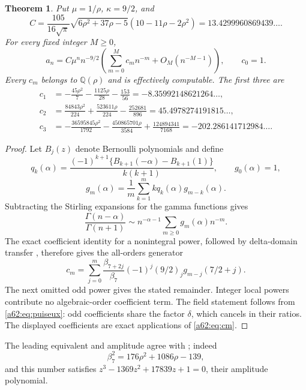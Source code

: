 \documentclass[11pt,letterpaper]{article}
\newtheorem{theorem}{Theorem}[section]
\theoremstyle{remark}\newtheorem{remark}[theorem]{Remark}
\newcommand{\Q}{\mathbb Q}
\begin{document}
\begin{theorem}\label{a62:thm:asymptotic}
Put $\mu=1/\rho$, $\kappa=9/2$, and
\[
 C=\frac{105}{16\sqrt\pi}\sqrt{6\rho^2+37\rho-5}(10-11\rho-2\rho^2)
 =13.4299960869439\ldots.
\]
For every fixed integer $M\ge0$,
\[
 a_n=C\mu^n n^{-9/2}\left(\sum_{m=0}^M c_mn^{-m}+O_M(n^{-M-1})\right),\qquad c_0=1.
\]
Every $c_m$ belongs to $\Q(\rho)$ and is effectively computable. The first three are
\begin{align*}
 c_1&=-\frac{45\rho^2}{7}-\frac{1125\rho}{28}-\frac{153}{56}
 =-8.35992148621264\ldots,\\
 c_2&=\frac{84843\rho^2}{224}+\frac{523611\rho}{224}-\frac{252681}{896}
 =45.4978274191815\ldots,\\
 c_3&=-\frac{36595845\rho^2}{1792}-\frac{450865701\rho}{3584}
       +\frac{124894341}{7168}
 =-202.286141712984\ldots.
\end{align*}
\end{theorem}
\begin{proof}
Let $B_j(z)$ denote Bernoulli polynomials and define
\[
 q_k(\alpha)=\frac{(-1)^{k+1}\{B_{k+1}(-\alpha)-B_{k+1}(1)\}}{k(k+1)},\qquad
 g_0(\alpha)=1,
\]
\[
 g_m(\alpha)=\frac1m\sum_{k=1}^m kq_k(\alpha)g_{m-k}(\alpha).
\]
Subtracting the Stirling expansions for the gamma functions gives
\[
 \frac{\Gamma(n-\alpha)}{\Gamma(n+1)}
 \sim n^{-\alpha-1}\sum_{m\ge0}g_m(\alpha)n^{-m}.
\]
The exact coefficient identity for a nonintegral power, followed by delta-domain transfer \cite{FS}, therefore gives the all-orders generator
\begin{equation}\label{a62:eq:cm}
 c_m=\sum_{j=0}^m\frac{\beta_{7+2j}}{\beta_7}(-1)^j(9/2)_j
                g_{m-j}(7/2+j).
\end{equation}
The next omitted odd power gives the stated remainder. Integer local powers contribute no algebraic-order coefficient term. The field statement follows from \eqref{a62:eq:puiseux}: odd coefficients share the factor $\delta$, which cancels in their ratios. The displayed coefficients are exact applications of \eqref{a62:eq:cm}.
\end{proof}

The leading equivalent and amplitude agree with \cite{GK}; indeed
\[
 \beta_7^2=176\rho^2+1086\rho-139,
\]
and this number satisfies $z^3-1369z^2+17839z+1=0$, their amplitude polynomial.
\end{document}
